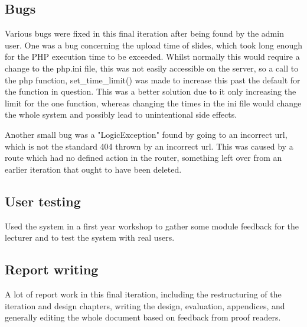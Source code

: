 \subsection{Bugs}
Various bugs were fixed in this final iteration after being found by the admin user. One was a bug concerning the upload time of slides, which took long enough for the PHP execution time to be exceeded. Whilst normally this would require a change to the php.ini file, this was not easily accessible on the server, so a call to the php function, set\_time\_limit() was made to increase this past the default for the function in question. This was a better solution due to it only increasing the limit for the one function, whereas changing the times in the ini file would change the whole system and possibly lead to unintentional side effects.

Another small bug was a "LogicException" found by going to an incorrect url, which is not the standard 404 thrown by an incorrect url. This was caused by a route which had no defined action in the router, something left over from an earlier iteration that ought to have been deleted.

\subsection{User testing}
Used the system in a first year workshop to gather some module feedback for the lecturer and to test the system with real users.

\subsection{Report writing}
A lot of report work in this final iteration, including the restructuring of the iteration and design chapters, writing the design, evaluation, appendices, and generally editing the whole document based on feedback from proof readers.
\newpage